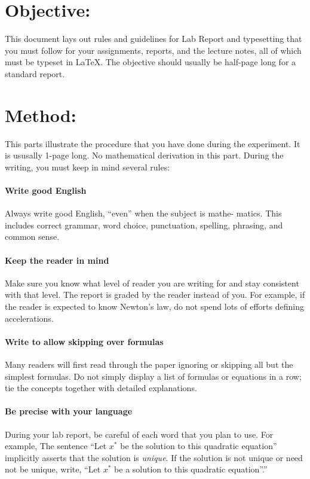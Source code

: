 

\rmfamily
\section{Objective:}
This document lays out rules and guidelines for Lab Report and typesetting that you must follow for your assignments, reports, and the lecture notes, all of which must be typeset in \LaTeX.
The objective should usually be half-page long for a standard report.





\section{Method:}
This parts illustrate the procedure that you have done during the experiment. It is ususally 1-page long. No mathematical derivation in this part. During the writing, you must keep in mind several rules:

\paragraph{Write good English}
Always write good English, “even” when the subject is mathe- matics. This includes correct grammar, word choice, punctuation, spelling, phrasing, and common sense.

\paragraph{Keep the reader in mind}
Make sure you know what level of reader you are writing for and stay consistent with that level. The report is graded by the reader instead of you. For example, if the reader is expected to know Newton's law, do not spend lots of efforts defining accelerations.

\paragraph{Write to allow skipping over formulas}
Many readers will first read through the paper ignoring or skipping all but the simplest formulas. Do not simply display a list of formulas or equations in a row; tie the concepts together with detailed explanations.

\paragraph{Be precise with your language}
During your lab report, be careful of each word that you plan to use. For example, The sentence “Let $x^*$ be the solution to this quadratic equation” implicitly asserts that the solution is \emph{unique}. If the solution is not unique or need not be unique, write, “Let $x^*$ be a solution to this quadratic equation”.”

